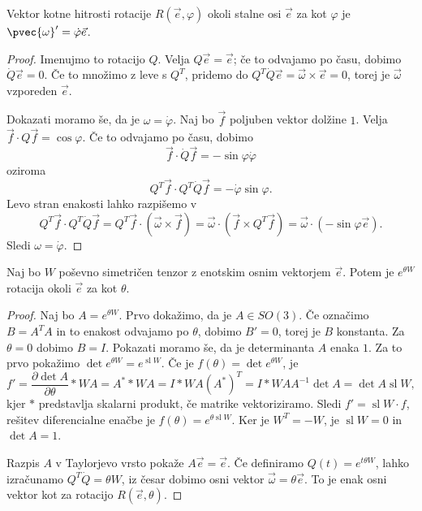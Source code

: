 \begin{trditev}
  Vektor kotne hitrosti rotacije $R(\vec{e}, \varphi)$ okoli stalne osi
  $\vec{e}$ za kot $\varphi$ je $\pvec{\omega}' = \dot{\varphi} \vec{e}$.
\end{trditev}

\begin{proof}
  Imenujmo to rotacijo $Q$.
  Velja $Q \vec{e} = \vec{e}$; če to odvajamo po času, dobimo $\dot{Q} \vec{e} =
  0$.
  Če to množimo z leve s $Q^T$, pridemo do $Q^T \dot{Q} \vec{e} = \vec{\omega}
  \times \vec{e} = 0$, torej je $\vec{\omega}$ vzporeden $\vec{e}$.

  Dokazati moramo še, da je $\omega = \dot{\varphi}$.
  Naj bo $\vec{f}$ poljuben vektor dolžine $1$.
  Velja $\vec{f} \cdot Q \vec{f} = \cos \varphi$.
  Če to odvajamo po času, dobimo
  \[
	\vec{f} \cdot \dot{Q} \vec{f} = - \sin \varphi \dot{\varphi}
  \]
  oziroma
  \[
	Q^T \vec{f} \cdot Q^T \dot{Q} \vec{f} = - \dot{\varphi} \sin \varphi.
  \]
  Levo stran enakosti lahko razpišemo v
  \[
	Q^T \vec{f} \cdot Q^T \dot{Q} \vec{f}
	= Q^T \vec{f} \cdot (\vec{\omega} \times \vec{f})
	= \vec{\omega} \cdot (\vec{f} \times Q^T \vec{f})
	= \vec{\omega} \cdot (- \sin \varphi \vec{e}).
  \]
  Sledi $\omega = \dot{\varphi}$.
\end{proof}


\begin{trditev}
  Naj bo $W$ poševno simetričen tenzor z enotskim osnim vektorjem $\vec{e}$.
  Potem je $e^{\theta W}$ rotacija okoli $\vec{e}$ za kot $\theta$.
\end{trditev}

\begin{proof}
  Naj bo $A = e^{\theta W}$.
  Prvo dokažimo, da je $A \in SO(3)$.
  Če označimo $B = A^T A$ in to enakost odvajamo po $\theta$, dobimo $B' = 0$,
  torej je $B$ konstanta.
  Za $\theta = 0$ dobimo $B = I$.
  Pokazati moramo še, da je determinanta $A$ enaka $1$.
  Za to prvo pokažimo $\det e^{\theta W} = e^{\operatorname{sl} W}$.
  Če je $f(\theta) = \det e^{\theta W}$, je
  \[
	f'
	= \frac{\partial \det A}{\partial \theta} * WA
	= A^* * WA
	= I * WA (A^*)^T
	= I * WA A^{-1} \det A = \det A \operatorname{sl} W,
  \]
  kjer $*$ predstavlja skalarni produkt, če matrike vektoriziramo.
  Sledi $f' = \operatorname{sl} W \cdot f$, rešitev diferencialne enačbe je
  $f(\theta) = e^{\theta \operatorname{sl} W}$.
  Ker je $W^T = -W$, je $\operatorname{sl} W = 0$ in $\det A = 1$.

  Razpis $A$ v Taylorjevo vrsto pokaže $A \vec{e} = \vec{e}$.
  Če definiramo $Q(t) = e^{t \theta W}$, lahko izračunamo $Q^T \dot{Q} = \theta
  W$, iz česar dobimo osni vektor $\vec{\omega} = \theta \vec{e}$.
  To je enak osni vektor kot za rotacijo $R(\vec{e}, \theta)$.
\end{proof}

